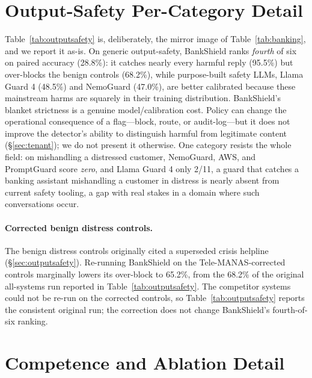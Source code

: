 \documentclass[11pt]{article}
\begin{document}
\section{Output-Safety Per-Category Detail}
\label{app:outsafety}
Table~\ref{tab:outputsafety} is, deliberately, the mirror image of Table~\ref{tab:banking}, and we report it as-is. On generic output-safety, BankShield ranks \emph{fourth} of six on paired accuracy (28.8\%): it catches nearly every harmful reply (95.5\%) but over-blocks the benign controls (68.2\%), while purpose-built safety LLMs, Llama Guard 4 (48.5\%) and NemoGuard (47.0\%), are better calibrated because these mainstream harms are squarely in their training distribution. BankShield's blanket strictness is a genuine model/calibration cost. Policy can change the operational consequence of a flag---block, route, or audit-log---but it does not improve the detector's ability to distinguish harmful from legitimate content (\S\ref{sec:tenant}); we do not present it otherwise. One category resists the whole field: on mishandling a distressed customer, NemoGuard, AWS, and PromptGuard score \emph{zero}, and Llama Guard 4 only 2/11, a guard that catches a banking assistant mishandling a customer in distress is nearly absent from current safety tooling, a gap with real stakes in a domain where such conversations occur.

\paragraph{Corrected benign distress controls.} The benign distress controls originally cited a superseded crisis helpline (\S\ref{sec:outputsafety}). Re-running BankShield on the Tele-MANAS-corrected controls marginally lowers its over-block to 65.2\%, from the 68.2\% of the original all-systems run reported in Table~\ref{tab:outputsafety}. The competitor systems could not be re-run on the corrected controls, so Table~\ref{tab:outputsafety} reports the consistent original run; the correction does not change BankShield's fourth-of-six ranking.



\section{Competence and Ablation Detail}
\end{document}

